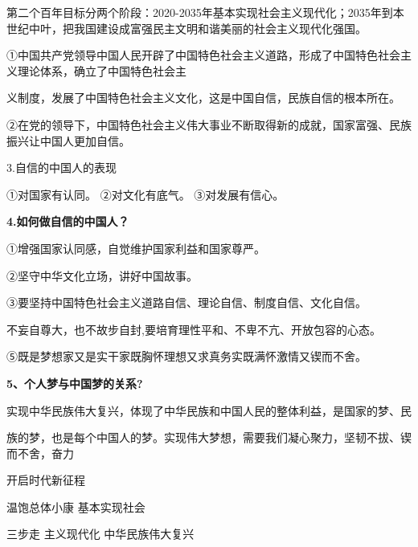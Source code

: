\documentclass[lang=cn,11pt]{elegantbook}
\newcommand{\daofasym}[1]{{\daofasymbolfont #1}}
\newcommand{\daofasym}[1]{#1}
\begin{document}
第二个百年目标分两个阶段：2020-2035年基本实现社会主义现代化；2035年到本世纪中叶，把我国建设成富强民主文明和谐美丽的社会主义现代化强国。\par

\daofasym{①}中国共产党领导中国人民开辟了中国特色社会主义道路，形成了中国特色社会主义理论体系，确立了中国特色社会主\par

义制度，发展了中国特色社会主义文化，这是中国自信，民族自信的根本所在。\par

\daofasym{②}在党的领导下，中国特色社会主义伟大事业不断取得新的成就，国家富强、民族振兴让中国人更加自信。\par

3.自信的中国人的表现\par

\daofasym{①}对国家有认同。 \daofasym{②}对文化有底气。 \daofasym{③}对发展有信心。\par

\textbf{4.如何做自信的中国人？}\par

\daofasym{①}增强国家认同感，自觉维护国家利益和国家尊严。\par

\daofasym{②}坚守中华文化立场，讲好中国故事。\par

\daofasym{③}要坚持中国特色社会主义道路自信、理论自信、制度自信、文化自信。\par

不妄自尊大，也不故步自封,要培育理性平和、不卑不亢、开放包容的心态。\par

\daofasym{⑤}既是梦想家又是实干家既胸怀理想又求真务实既满怀激情又锲而不舍。\par

\textbf{5、个人梦与中国梦的关系?}\par

实现中华民族伟大复兴，体现了中华民族和中国人民的整体利益，是国家的梦、民\par

族的梦，也是每个中国人的梦。实现伟大梦想，需要我们凝心聚力，坚韧不拔、锲而不舍，奋力\par

开启时代新征程\par

温饱总体小康 基本实现社会\par

三步走 主义现代化 中华民族伟大复兴\par
\end{document}
